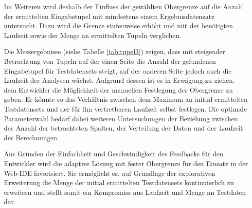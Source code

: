 Im Weiteren wird deshalb der Einfluss der gewählten Obergrenze auf die Anzahl der ermittelten Eingabetupel mit mindestens einem Ergebnisdatensatz untersucht.
Dazu wird die Grenze stufenweise erhöht und mit der benötigten Laufzeit sowie der Menge an ermittelten Tupeln verglichen.

Die Messergebnisse (siehe Tabelle \ref{tab:tupel3}) zeigen, dass mit steigender Betrachtung von Tupeln auf der einen Seite die Anzahl der gefundenen Eingabetupel für Testdatensets steigt, auf der anderen Seite jedoch auch die Laufzeit der Analysen wächst.
Aufgrund dessen ist es in Erwägung zu ziehen, dem Entwickler die Möglichkeit der manuellen Festlegung der Obergrenze zu geben.
Er könnte so das Verhältnis zwischen dem Maximum an initial ermittelten Testdatensets und der für ihn vertretbaren Laufzeit selbst festlegen.
Die optimale Parameterwahl bedarf dabei weiteren Untersuchungen der Beziehung zwischen der Anzahl der betrachteten Spalten, der Verteilung der Daten und der Laufzeit der Berechnungen.

\begin{table}[ht]
	\centering
	\caption{Auswirkung der Wahl der Obergrenze auf Eingabetupel und Laufzeit}
	\label{tab:tupel3}
\end{table}

Aus Gründen der Einfachheit und Geschwindigkeit des Feedbacks für den Entwickler wird die adaptive Lösung mit fester Obergrenze für den Einsatz in der Web-IDE favorisiert.
Sie ermöglicht es, auf Grundlage der explorativen Erweiterung die Menge der initial ermittelten Testdatensets kontinuierlich zu erweitern und stellt somit ein Kompromiss aus Laufzeit und Menge an Testdaten dar.








